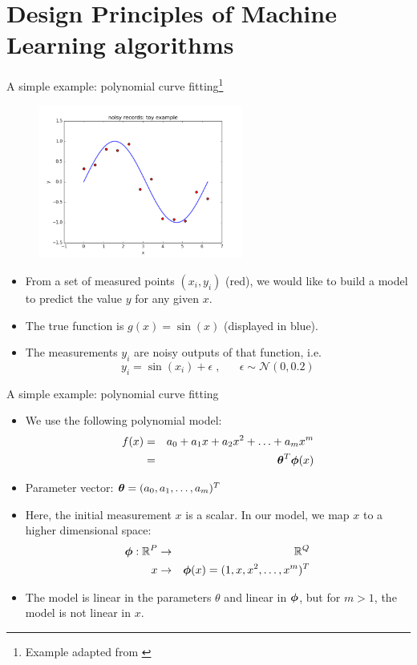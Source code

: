 \documentclass[xcolor=pdftex,dvipsnames,table]{beamer}
\begin{document}
\section{Design Principles of Machine Learning algorithms}

\begin{frame}{A simple example: polynomial curve fitting\footnote{Example adapted from \cite{Bishop2006}}}
\begin{figure}[htb]
\includegraphics[width=0.6\textwidth]{../graphics/sample_from_sin.png}
\end{figure}
\begin{itemize}
	\item From a set of measured points $(x_i, y_i)$ (red), we would like to build a model to predict the value $y$ for any given $x$.
	\item The true function is $g(x)=\sin (x)$ (displayed in blue).
	\item The measurements $y_i$ are noisy outputs of that function, i.e.
	\begin{equation}
	y_i = \sin (x_i) + \epsilon \; , \;\;\; \;\;\; \epsilon \sim \mathcal{N}(0,0.2)
	\end{equation}
\end{itemize}
\end{frame}

\begin{frame}{A simple example: polynomial curve fitting}
\begin{itemize}
	\item We use the following polynomial model:
	\begin{eqnarray}
	f(x) &=& a_0 + a_1 x + a_2 x^2 + \ldots + a_m x^m \nonumber \\
	&=& \boldsymbol{\theta}^T \boldsymbol{\phi} (x)
	\end{eqnarray}
	\item Parameter vector: $\boldsymbol{\theta} = (a_0, a_1, \ldots, a_m)^T$
	\item Here, the initial measurement $x$ is a scalar. In our model, we map $x$ to a higher dimensional space:
	\begin{eqnarray}
		\boldsymbol{\phi} : \mathbb{R}^{P} &\rightarrow & \mathbb{R}^Q \nonumber \\
		x &\rightarrow & \boldsymbol{\phi} (x) = (1, x, x^2, \ldots, x^m)^T
	\end{eqnarray}
	\item The model is linear in the parameters $\theta$ and linear in $\boldsymbol{\phi}$, but for $m>1$, the model is not linear in $x$.
\end{itemize}
\end{frame}
\end{document}
